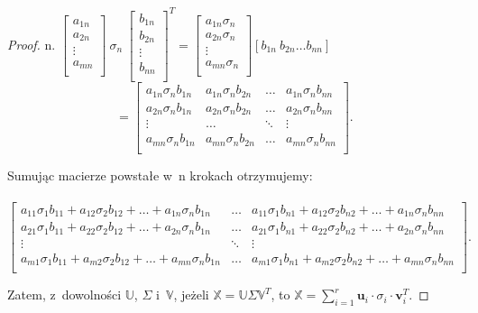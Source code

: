 \documentclass[12pt,a4paper]{report}
\begin{document}
\begin{proof}
n.
$\left[ \begin{array}{c}
         a_{1n} \\
         a_{2n} \\
         \vdots \\
         a_{mn} \\
         \end{array}
      \right] \: \sigma_{n} \: \left[ \begin{array}{c}
         b_{1n} \\
         b_{2n} \\
         \vdots \\
         b_{nn} \\
         \end{array}
      \right]^T= \left[
        \begin{array}{c}
         a_{1n} \sigma_{n} \\
         a_{2n} \sigma_{n} \\
         \vdots \\
         a_{mn} \sigma_{n} \\
         \end{array}
      \right] [b_{1n} \: b_{2n} \ldots b_{nn}] $
      $$=  \left[
        \begin{array}{cccc}
         a_{1n} \sigma_{n} b_{1n}  & a_{1n} \sigma_{n} b_{2n} & \ldots & a_{1n} \sigma_{n} b_{nn}  \\
         a_{2n} \sigma_{n} b_{1n} & a_{2n} \sigma_{n} b_{2n} & \ldots & a_{2n} \sigma_{n} b_{nn} \\
         \vdots & \ldots & \ddots & \vdots \\
         a_{mn} \sigma_{n} b_{1n} & a_{mn} \sigma_{n} b_{2n} & \ldots & a_{mn} \sigma_{n} b_{nn} \\
         \end{array}
      \right]. $$

Sumując macierze powstałe w~n krokach otrzymujemy:
\\
\\$\left[
        \begin{array}{ccc}
a_{11} \sigma_{1} b_{11} + a_{12} \sigma_{2} b_{12} + \ldots + a_{1n} \sigma_{n} b_{1n} & \ldots &  a_{11} \sigma_{1} b_{n1} + a_{12} \sigma_{2} b_{n2} + \ldots + a_{1n} \sigma_{n} b_{nn} \\
a_{21} \sigma_{1} b_{11} + a_{22} \sigma_{2} b_{12} + \ldots + a_{2n} \sigma_{n} b_{1n} & \ldots & a_{21} \sigma_{1} b_{n1} + a_{22} \sigma_{2} b_{n2} + \ldots + a_{2n} \sigma_{n} b_{nn} \\
         \vdots & \ddots & \vdots \\
a_{m1} \sigma_{1} b_{11} + a_{m2} \sigma_{2} b_{12} + \ldots + a_{mn} \sigma_{n} b_{1n} & \ldots & a_{m1} \sigma_{1} b_{n1} + a_{m2} \sigma_{2} b_{n2} + \ldots + a_{mn} \sigma_{n} b_{nn} \\
         \end{array}
      \right].$

\bigskip
Zatem, z~dowolności $\mathbb{U}$, $\Sigma$ i~$\mathbb{V}$, jeżeli $\mathbb{X}=\mathbb{U} \Sigma \mathbb{V}^T$, to $\mathbb{X} = \sum_{i=1}^r \mathbf{u}_i \cdot\sigma_{i} \cdot \mathbf{v}_i^T$.
\end{proof}
\bigskip
\end{document}
